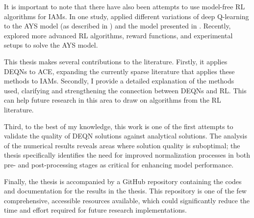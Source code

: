 It is important to note that there have also been attempts to use model-free RL algorithms for IAMs. In one study, \textcite{strnard2019deepRLworld-earth} applied different variations of deep Q-learning \parencite{MnihVolodymyr2013PAwD} to the AYS model (as described in \textcite{Heitzig2018AYS}) and the model presented in \textcite{Nitzbon2017world-earth-mod}. Recently, \textcite{Wolf2023rl-to-iam}  explored more advanced RL algorithms, reward functions, and experimental setups to solve the AYS model.

This thesis makes several contributions to the literature. Firstly, it applies DEQNs to ACE, expanding the currently sparse literature that applies these methods to IAMs. Secondly, I provide a detailed explanation of the methods used, clarifying and strengthening the connection between DEQNs and RL. This can help future research in this area to draw on algorithms from the RL literature. 

Third, to the best of my knowledge, this work is one of the first attempts to validate the quality of DEQN solutions against analytical solutions. The analysis of the numerical results reveals areas where solution quality is suboptimal; the thesis specifically identifies the need for improved normalization processes in both pre- and post-processing stages as critical for enhancing model performance. 

Finally, the thesis is accompanied by a GitHub repository containing the codes and documentation for the results in the thesis. This repository is one of the few comprehensive, accessible resources available, which could significantly reduce the time and effort required for future research implementations.